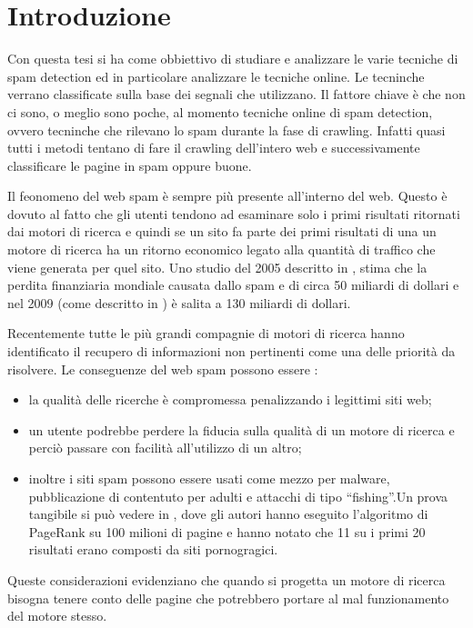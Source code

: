 \chapter{Introduzione}

Con questa tesi si ha come obbiettivo di studiare e analizzare le varie tecniche di spam detection ed in particolare analizzare le tecniche online. Le tecninche verrano classificate sulla base dei segnali che utilizzano. Il fattore chiave è che non ci sono, o meglio sono poche, al momento tecniche online di spam detection, ovvero tecninche che rilevano lo spam durante la fase di crawling. Infatti quasi tutti i metodi tentano di fare il crawling dell'intero web e successivamente classificare le pagine in spam oppure buone.

Il feonomeno del web spam è sempre più presente all'interno del web. Questo è dovuto al fatto che gli utenti tendono ad esaminare solo i primi risultati ritornati dai motori di ricerca e quindi se un sito fa parte dei primi risultati di una un motore di ricerca ha un ritorno economico legato alla quantità di traffico che viene generata per quel sito. Uno studio  del 2005 descritto in \cite{Nicholas:2005}, stima che la perdita finanziaria mondiale causata dallo spam e di circa 50 miliardi di dollari e nel 2009 (come descritto in \cite{Nicholas:2009}) è salita a 130 miliardi di dollari.

Recentemente tutte le più grandi compagnie di motori di ricerca hanno identificato il recupero di informazioni non pertinenti come una delle priorità da risolvere. Le conseguenze del web spam possono essere \cite{Spirin:2012:SWS:2207243.2207252}:
\begin{itemize}
 \item la qualità delle ricerche è compromessa penalizzando i legittimi siti web;
 \item un utente podrebbe perdere la fiducia sulla qualità di un motore di ricerca e perciò passare con facilità all'utilizzo di un altro;
 \item inoltre i siti spam possono essere usati come mezzo per malware, pubblicazione di contentuto per adulti e attacchi di tipo ``fishing''.Un prova tangibile si può vedere in \cite{Eiron:2004:RWF:988672.988714}, dove gli autori hanno eseguito l'algoritmo di PageRank su 100 milioni di pagine e hanno notato che 11 su i primi 20 risultati erano composti da siti pornogragici.
\end{itemize}
Queste considerazioni evidenziano che quando si progetta un motore di ricerca bisogna tenere conto delle pagine che potrebbero portare al mal funzionamento del motore stesso.

